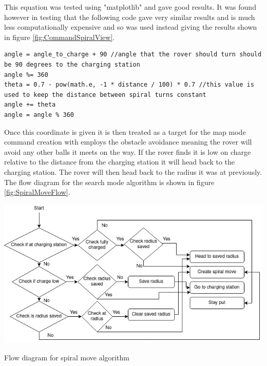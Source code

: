 \documentclass[10pt,twoside]{article}
\begin{document}
This equation was tested using "matplotlib" and gave good results. It was found however in testing that the following code gave very similar results and is much less computationally expensive and so was used instead giving the results shown in figure \ref{fig:CommandSpiralView}. 
\begin{verbatim}
angle = angle_to_charge + 90 //angle that the rover should turn should be 90 degrees to the charging station
angle %= 360
theta = 0.7 - pow(math.e, -1 * distance / 100) * 0.7 //this value is used to keep the distance between spiral turns constant
angle += theta
angle = angle % 360
\end{verbatim}
Once this coordinate is given it is then treated as a target for the map mode command creation with employs the obstacle avoidance meaning the rover will avoid any other balls it meets on the way. If the rover finds it is low on charge relative to the distance from the charging station it will head back to the charging station. The rover will then head back to the radius it was at previously. The flow diagram for the search mode algorithm is shown in figure \ref{fig:SpiralMoveFlow}.

\begin{minipage}{.5\textwidth}
    \centering
    \includegraphics[scale = 0.7]{CommandSpiralMoveFlowAlgo.jpg}
    \caption{Flow diagram for spiral move algorithm}
    \label{fig:SpiralMoveFlow}
\end{minipage}
\end{document}
